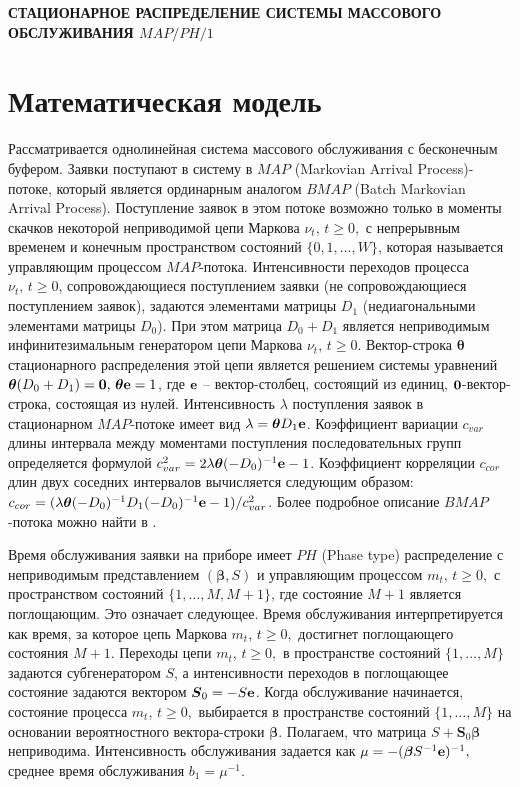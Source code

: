 \documentclass[12pt,a4paper]{article}
\newcommand{\bs}{\boldsymbol}
\begin{document}
\begin{center}
{\bf  СТАЦИОНАРНОЕ РАСПРЕДЕЛЕНИЕ СИСТЕМЫ МАССОВОГО ОБСЛУЖИВАНИЯ  $MAP/PH/1$}
\end{center}




\section{ Математическая модель}


Рассматривается  однолинейная система массового обслуживания с бесконечным буфером.
Заявки поступают в систему в  $MAP$ (Markovian Arrival Process)-потоке, который является ординарным аналогом  $BMAP$ 
(Batch Markovian Arrival Process).
 Поступление заявок в этом потоке возможно только в моменты скачков некоторой
неприводимой цепи Маркова $\nu_t,\,t\geq 0,$ с непрерывным временем
и конечным пространством состояний $\{0,1,\dots,W\}$, которая
называется управляющим процессом $MAP$-потока. Интенсивности
переходов процесса $\nu_t,\,t\geq 0$, сопровождающиеся поступлением
заявки  (не сопровождающиеся поступлением
заявок), задаются элементами матрицы $D_1$ (недиагональными
элементами матрицы $D_0$).
 При этом матрица
$D_0+D_1$ является неприводимым инфинитезимальным генератором цепи
Маркова $\nu_t,\,t\geq 0$. Вектор-строка $\bs \theta$ стационарного
распределения этой цепи является решением системы уравнений
$\bs\theta (D_0+D_1)= {\bf 0},\, \bs\theta{\bf e }= 1$, где $\bf e$  --
вектор-столбец, состоящий из единиц, $\bf 0$-вектор-строка, состоящая из нулей. Интенсивность  $\lambda$
поступления заявок в стационарном $MAP$-потоке имеет вид $\lambda =
\bs\theta D_1 {\bf e}$. Коэффициент вариации $c_{var}$
длины интервала  между моментами поступления последовательных групп
определяется формулой $c_{var}^2 = 2\lambda
\bs\theta(-D_0)^{-1}{\bf e} - 1$. Коэффициент корреляции $c_{cor}$
длин двух соседних интервалов вычисляется следующим образом:
$c_{cor} = (\lambda\bs\theta(-D_0)^{-1}D_1(-D_0)^{-1}{\bf e}
- 1)/c_{var}^2$.
Более подробное описание $BMAP$-потока можно найти в
\cite{bib:Luc91}.

Время обслуживания заявки на  приборе  имеет $PH$ (Phase type) распределение
  с неприводимым представлением
$({\boldsymbol \beta},S)$  и управляющим процессом $m_t,
\,t \ge0,$ с пространством состояний $\{1,\dots,M, M+1\}$, где
состояние $M+1$ является поглощающим.
 Это означает следующее.
 Время обслуживания  интерпретируется как время, за которое цепь Маркова
 $m_t$, $t \geq 0,$  достигнет  поглощающего состояния $M+1$. Переходы цепи $m_t$, $t \geq 0,$ в пространстве состояний
 $\{1,\ldots,M\}$ задаются субгенератором $S$, а интенсивности переходов в поглощающее состояние задаются вектором  $\bs 
 S_0 = -S {\bf e}$. Когда обслуживание начинается, состояние процесса  $m_t$, $t \geq 0,$ выбирается  в пространстве 
 состояний $\{1,\ldots,M\}$ на основании вероятностного вектора-строки $\bs{\beta}$. Полагаем, что  матрица $S+\bs
 S_0\bs{\beta} $ неприводима. Интенсивность обслуживания задается как
 $\mu=-(\bs{\beta}S^{-1}{\bf e})^{-1},$ среднее время обслуживания $b_1=\mu^{-1}.$
\end{document}
